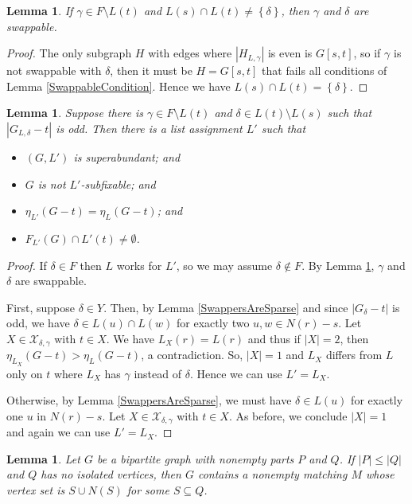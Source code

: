 \documentclass[12pt]{article}
\theoremstyle{plain}
\newtheorem{lem}[thm]{Lemma}
\theoremstyle{definition}
\theoremstyle{remark}
\newcommand{\fancy}[1]{\mathcal{#1}}
\newcommand{\set}[1]{\left\{ #1 \right\}}
\newcommand{\card}[1]{\left|#1\right|}
\def\X{\fancy{X}}
\begin{document}
	\begin{lem}\label{SingleGammaMuchSwappage}
		If $\gamma \in F \setminus L(t)$ and $L(s) \cap L(t) \ne \set{\delta}$, then $\gamma$ and $\delta$ are swappable.
	\end{lem}
	\begin{proof}
			The only subgraph $H$ with edges where $\card{H_{L, \gamma}}$ is even is $G[s, t]$, so if $\gamma$ is not swappable with $\delta$, then it must be $H = G[s, t]$ that fails all conditions of Lemma \ref{SwappableCondition}.  Hence we have $L(s) \cap L(t) = \set{\delta}$.
	\end{proof}
	
	\begin{lem}\label{Odd_delta}
		Suppose there is $\gamma \in F \setminus L(t)$ and $\delta \in L(t) \setminus L(s)$ such that $\card{G_{L, \delta} - t}$ is odd.  Then there is a list assignment $L'$ such that
		\begin{itemize}
			\item $(G, L')$ is superabundant; and
			\item $G$ is not $L'$-subfixable; and
			\item $\eta_{L'}(G - t) = \eta_L(G-t)$; and
			\item $F_{L'}(G) \cap L'(t) \ne \emptyset$.
		\end{itemize}
	\end{lem}
	\begin{proof}
		If $\delta \in F$ then $L$ works for $L'$, so we may assume $\delta \not \in F$.  By Lemma \ref{SingleGammaMuchSwappage}, $\gamma$ and $\delta$ are swappable.
		
		First, suppose $\delta \in Y$. Then, by Lemma \ref{SwappersAreSparse} and since $\card{G_\delta - t}$ is odd, we have $\delta \in L(u) \cap L(w)$ for exactly two $u,w \in N(r) - s$.   Let $X \in \X_{\delta,\gamma}$ with $t \in X$.  We have $L_X(r) = L(r)$ and thus if $|X| = 2$, then $\eta_{L_X}(G - t) > \eta_L(G - t)$, a contradiction.  So, $|X| = 1$ and $L_X$ differs from $L$ only on $t$ where $L_X$ has $\gamma$ instead of $\delta$.  Hence we can use $L' = L_X$.
		
		Otherwise, by Lemma \ref{SwappersAreSparse}, we must have $\delta \in L(u)$ for exactly one $u$ in $N(r) - s$.  Let $X \in \X_{\delta,\gamma}$ with $t \in X$. As before, we conclude $|X| = 1$ and again we can use $L' = L_X$.
	\end{proof}
	
		
		\begin{lem}\label{SpannerSpecial}
			Let $G$ be a bipartite graph with nonempty parts $P$ and $Q$.  If $|P| \le |Q|$ and $Q$ has no isolated vertices, then $G$ contains a nonempty matching $M$ whose vertex set is $S \cup N(S)$ for some $S \subseteq Q$.
		\end{lem}
		
\end{document}
